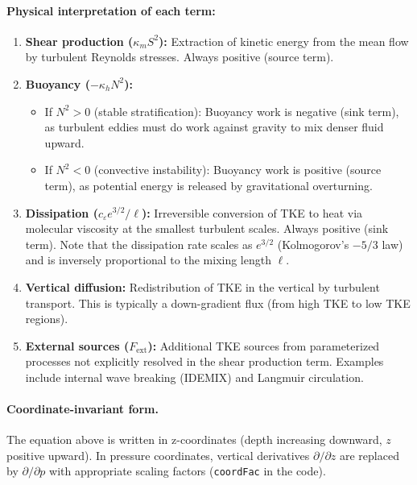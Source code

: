 \documentclass[12pt,letterpaper]{article}
\begin{document}
\paragraph{Physical interpretation of each term:}
\begin{enumerate}
\item \textbf{Shear production ($\kappa_m S^2$):} Extraction of kinetic energy from the mean flow by turbulent Reynolds stresses. Always positive (source term).

\item \textbf{Buoyancy ($-\kappa_h N^2$):}
\begin{itemize}
\item If $N^2 > 0$ (stable stratification): Buoyancy work is negative (sink term), as turbulent eddies must do work against gravity to mix denser fluid upward.
\item If $N^2 < 0$ (convective instability): Buoyancy work is positive (source term), as potential energy is released by gravitational overturning.
\end{itemize}

\item \textbf{Dissipation ($c_\varepsilon e^{3/2}/\ell$):} Irreversible conversion of TKE to heat via molecular viscosity at the smallest turbulent scales. Always positive (sink term). Note that the dissipation rate scales as $e^{3/2}$ (Kolmogorov's $-5/3$ law) and is inversely proportional to the mixing length $\ell$.

\item \textbf{Vertical diffusion:} Redistribution of TKE in the vertical by turbulent transport. This is typically a down-gradient flux (from high TKE to low TKE regions).

\item \textbf{External sources ($F_{\text{ext}}$):} Additional TKE sources from parameterized processes not explicitly resolved in the shear production term. Examples include internal wave breaking (IDEMIX) and Langmuir circulation.
\end{enumerate}

\paragraph{Coordinate-invariant form.} The equation above is written in z-coordinates (depth increasing downward, $z$ positive upward). In pressure coordinates, vertical derivatives $\partial/\partial z$ are replaced by $\partial/\partial p$ with appropriate scaling factors (\verb|coordFac| in the code).
\end{document}

